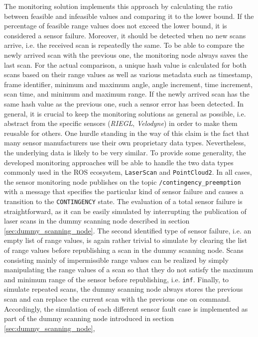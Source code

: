 \documentclass[english, master, utf8]{base/thesis_KBS}
\newcommand{\code}[1]{\colorbox{light-gray}{\texttt{#1}}}
\begin{document}
\noindent
The monitoring solution implements this approach by calculating the ratio between feasible and infeasible values and comparing it to the lower bound.
If the percentage of feasible range values does not exceed the lower bound, it is considered a sensor failure.
Moreover, it should be detected when no new scans arrive, i.e. the received scan is repeatedly the same.
To be able to compare the newly arrived scan with the previous one, the monitoring node always saves the last scan.
For the actual comparison, a unique hash value is calculated for both scans based on their range values as well as various metadata such as timestamp,
frame identifier, minimum and maximum angle, angle increment, time increment, scan time, and minimum and maximum range.
If the newly arrived scan has the same hash value as the previous one, such a sensor error has been detected.
In general, it is crucial to keep the monitoring solutions as general as possible, i.e. abstract from the specific sensors (\textit{RIEGL}, \textit{Velodyne})
in order to make them reusable for others. One hurdle standing in the way of this claim is the fact that many sensor manufacturers use their own proprietary data types.
Nevertheless, the underlying data is likely to be very similar. To provide some generality, the developed monitoring approaches will be able to handle the two data 
types commonly used in the ROS ecosystem, \code{LaserScan} and \code{PointCloud2}. In all cases, the sensor monitoring node publishes on the topic
\code{/contingency\_preemption} with a message that specifies the particular kind of sensor failure and causes a transition to the \code{CONTINGENCY} state.\newline
The evaluation of a total sensor failure is straightforward, as it can be easily simulated by interrupting the publication of laser scans in the dummy scanning node
described in section \ref{sec:dummy_scanning_node}. The second identified type of sensor failure, i.e. an empty list of range values, is again rather trivial to simulate
by clearing the list of range values before republishing a scan in the dummy scanning node. Scans consisting mainly of impermissible range values can be realized by 
simply manipulating the range values of a scan so that they do not satisfy the maximum and minimum range of the sensor before republishing, i.e. \code{inf}.
Finally, to simulate repeated scans, the dummy scanning node always stores the previous scan and can replace the current scan with the previous one on command.
Accordingly, the simulation of each different sensor fault case is implemented as part of the dummy scanning node introduced in section \ref{sec:dummy_scanning_node},
\end{document}
